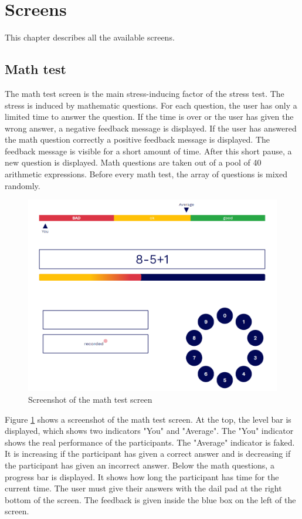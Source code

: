 \section{Screens}
\label{sec:screens}

This chapter describes all the available screens.

\subsection{Math test}
\label{sec:screens-math-test}

The math test screen is the main stress-inducing factor of the stress test.
The stress is induced by mathematic questions. 
For each question, the user has only a limited time to answer the question. 
If the time is over or the user has given the wrong answer, a negative feedback message is displayed. 
If the user has answered the math question correctly a positive feedback message is displayed. 
The feedback message is visible for a short amount of time. 
After this short pause, a new question is displayed.
Math questions are taken out of a pool of 40 arithmetic expressions. 
Before every math test, the array of questions is mixed randomly.

\begin{figure}[htb]
  \centering
  \includegraphics[width=\textwidth]{figures/Math-test.png}
  \caption{Screenshot of the math test screen}
  \label{fig:screenshot-math-test-screen}
\end{figure}

Figure \ref{fig:screenshot-math-test-screen} shows a screenshot of the math test screen.
At the top, the level bar is displayed, which shows two indicators "You" and "Average".
The "You" indicator shows the real performance of the participants.
The "Average" indicator is faked.
It is increasing if the participant has given a correct answer and is decreasing if the participant has given an incorrect answer.
Below the math questions, a progress bar is displayed.
It shows how long the participant has time for the current time.
The user must give their answers with the dail pad at the right bottom of the screen.
The feedback is given inside the blue box on the left of the screen.

